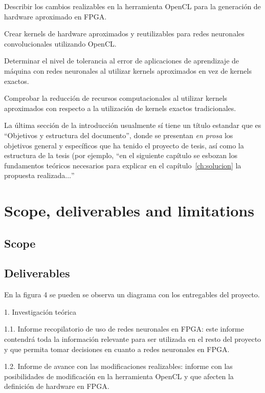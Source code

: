 \begin{compactitem}
    \item Describir los cambios realizables en la herramienta OpenCL para la generación de hardware aproximado en FPGA.
    \item Crear kernels de hardware aproximados y reutilizables para redes neuronales convolucionales utilizando OpenCL.
    \item Determinar el nivel de tolerancia al error de aplicaciones de aprendizaje de máquina con redes neuronales al utilizar kernels aproximados en vez de kernels exactos.
    \item Comprobar la reducción de recursos computacionales al utilizar kernels aproximados con respecto a la utilización de kernels exactos tradicionales.    
\end{compactitem}

La última sección de la introducción usualmente sí tiene un título estandar que
es ``Objetivos y estructura del documento'', donde se presentan \emph{en prosa}
los objetivos general y específicos que ha tenido el proyecto de tesis,
así como la estructura de la tesis (por ejemplo, ``en el siguiente capítulo se
esbozan los fundamentos teóricos necesarios para explicar en el
capítulo~\ref{ch:solucion} la propuesta realizada$\ldots$''

\section{Scope, deliverables and limitations}

\subsection{Scope}


\subsection{Deliverables}

En la figura 4 se pueden se observa un diagrama con los entregables del proyecto.

1. Investigación teórica

1.1. Informe recopilatorio de uso de redes neuronales en FPGA: este informe contendrá toda
la información relevante para ser utilizada en el resto del proyecto y que permita tomar
decisiones en cuanto a redes neuronales en FPGA.

1.2. Informe de avance con las modificaciones realizables: informe con las posibilidades de
modificación en la herramienta OpenCL y que afecten la definición de hardware en
FPGA.

